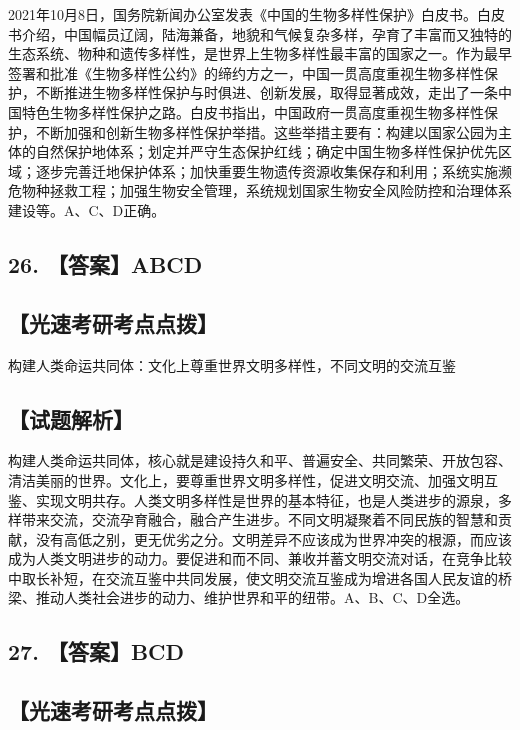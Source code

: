 \documentclass[UTF8,11pt]{ctexart}
\begin{document}
2021年10月8日，国务院新闻办公室发表《中国的生物多样性保护》白皮书。白皮书介绍，中国幅员辽阔，陆海兼备，地貌和气候复杂多样，孕育了丰富而又独特的生态系统、物种和遗传多样性，是世界上生物多样性最丰富的国家之一。作为最早签署和批准《生物多样性公约》的缔约方之一，中国一贯高度重视生物多样性保护，不断推进生物多样性保护与时俱进、创新发展，取得显著成效，走出了一条中国特色生物多样性保护之路。白皮书指出，中国政府一贯高度重视生物多样性保护，不断加强和创新生物多样性保护举措。这些举措主要有：构建以国家公园为主体的自然保护地体系；划定并严守生态保护红线；确定中国生物多样性保护优先区域；逐步完善迁地保护体系；加快重要生物遗传资源收集保存和利用；系统实施濒危物种拯救工程；加强生物安全管理，系统规划国家生物安全风险防控和治理体系建设等。A、C、D正确。


\subsection*{26. 【答案】ABCD}

\subsection*{【光速考研考点点拨】}

构建人类命运共同体：文化上尊重世界文明多样性，不同文明的交流互鉴


\subsection*{【试题解析】}

构建人类命运共同体，核心就是建设持久和平、普遍安全、共同繁荣、开放包容、清洁美丽的世界。文化上，要尊重世界文明多样性，促进文明交流、加强文明互鉴、实现文明共存。人类文明多样性是世界的基本特征，也是人类进步的源泉，多样带来交流，交流孕育融合，融合产生进步。不同文明凝聚着不同民族的智慧和贡献，没有高低之别，更无优劣之分。文明差异不应该成为世界冲突的根源，而应该成为人类文明进步的动力。要促进和而不同、兼收并蓄文明交流对话，在竞争比较中取长补短，在交流互鉴中共同发展，使文明交流互鉴成为增进各国人民友谊的桥梁、推动人类社会进步的动力、维护世界和平的纽带。A、B、C、D全选。


\subsection*{27. 【答案】BCD}

\subsection*{【光速考研考点点拨】}
\end{document}
